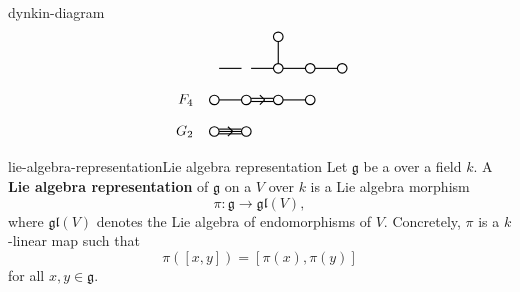 \begin{example}{dynkin-diagram}
\[\begin{tikzpicture}[scale=.4]
\begin{scope}[yshift=-20.0cm]
            \draw[thick] (4cm,0) circle (.3cm);
            \draw[thick] (6cm,0) circle (.3cm);
            \draw[thick] (8cm,0) circle (.3cm);
            \draw[thick] (4cm,2cm) circle (.3cm);
            \draw[thick] (0.3cm,0) -- +(1.4 cm,0);
            \draw[thick] (2.3cm,0) -- +(1.4 cm,0);
            \draw[thick] (4.3cm,0) -- +(1.4 cm,0);
            \draw[thick] (6.3cm,0) -- +(1.4 cm,0);
            \draw[thick] (4cm,0.3cm) -- +(0cm,1.4cm);
        \end{scope}
        \begin{scope}[yshift=-22.0cm]
            \draw (-1,0) node[anchor=east] {$F_4$};
            \draw[thick] (0cm,0) circle (.3cm);
            \draw[thick] (2cm,0) circle (.3cm);
            \draw[thick] (4cm,0) circle (.3cm);
            \draw[thick] (6cm,0) circle (.3cm);
            \draw[thick] (0.3cm,0) -- +(1.4 cm,0);
            \draw[thick] (4.3cm,0) -- +(1.4 cm,0);
            \draw[thick] (2.3cm,0.1cm) -- +(1.4 cm,0);
            \draw[thick] (2.3cm,-0.1cm) -- +(1.4 cm,0);
            \draw[thick] (2.85cm,0.3cm) -- +(0.3cm,-0.3cm);
            \draw[thick] (2.85cm,-0.3cm) -- +(0.3cm,0.3cm);
        \end{scope}
        \begin{scope}[yshift=-24.0cm]
            \draw (-1,0) node[anchor=east] {$G_2$};
            \draw[thick] (0cm,0) circle (.3cm);
            \draw[thick] (2cm,0) circle (.3cm);
            \draw[thick] (0.3cm,0.15cm) -- +(1.4 cm,0cm);
            \draw[thick] (0.3cm,0cm) -- +(1.4 cm,0cm);
            \draw[thick] (0.3cm,-0.15cm) -- +(1.4 cm,0cm);
            \draw[thick] (0.85cm,0.3cm) -- +(0.3cm,-0.3cm);
            \draw[thick] (0.85cm,-0.3cm) -- +(0.3cm,0.3cm);
        \end{scope}
    \end{tikzpicture} \]
\end{example}

\begin{topic}{lie-algebra-representation}{Lie algebra representation}
    Let $\mathfrak{g}$ be a  over a field $k$. A \textbf{Lie algebra representation} of $\mathfrak{g}$ on a  $V$ over $k$ is a Lie algebra morphism
    \[ \pi \colon \mathfrak{g} \to \mathfrak{gl}(V) , \]
    where $\mathfrak{gl}(V)$ denotes the Lie algebra of endomorphisms of $V$. Concretely, $\pi$ is a $k$-linear map such that
    \[ \pi([x, y]) = [\pi(x), \pi(y)] \]
    for all $x, y \in \mathfrak{g}$.
\end{topic}

